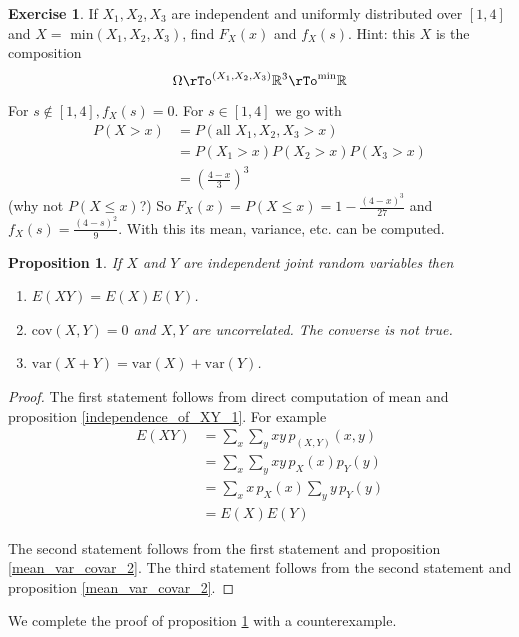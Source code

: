 \documentclass[12pt]{amsart}
\newtheorem{proposition}[theorem]{Proposition}
\theoremstyle{definition}
\newtheorem{exercise}[theorem]{Exercise}
\begin{document}
\begin{exercise} \label{minimum} If $X_1, X_2, X_3$ are independent and uniformly distributed over $[1,4]$ and $X= \text{ min}(X_1, X_2, X_3)$, find $F_X(x)$ and $f_X(s)$. Hint: this $X$ is the composition
$$\Omega \rTo^{(X_1, X_2, X_3)} \mathbb{R}^3 \rTo^{\textnormal{min}} \mathbb{R}$$

For $s \nin [1,4], f_X(s)=0$. For $s \in [1,4]$ we go with
\begin{align*}
P(X > x) & = P(\text{all } X_1, X_2, X_3 > x) \\
 & = P(X_1 > x)P(X_2 > x)P(X_3 > x) \\
 & = \left( \frac{4 - x}{3} \right)^{3}
\end{align*}
(why not $P(X \leq x)$?) So $F_X(x) = P(X \leq x) =1- \frac{(4 - x)^{3}}{27}$ and $f_X(s) = \frac{(4 - s)^2}{9}$. With this its mean, variance, etc. can be computed.
\end{exercise}

\begin{proposition} \label{mean_var_covar_3} If $X$ and $Y$ are independent joint random variables then
\begin{enumerate}[1.]
\item  $E(XY) = E(X)E(Y)$.
\item $\text{cov}(X, Y) = 0$ and $X, Y$ are uncorrelated. The converse is not true.
\item $\text{var}(X + Y) = \text{var}(X) + \text{var}(Y)$.
\end{enumerate}
\end{proposition}
\begin{proof} The first statement follows from direct computation of mean and proposition \ref{independence_of_XY_1}. For example
\begin{align*}
E(XY) & = \sum\limits_x \sum\limits_y xy \, p_{(X, Y)}(x, y) \\
 & = \sum\limits_x \sum\limits_y xy \, p_X(x)p_Y(y) \\
 & = \sum\limits_x x \,p_X(x) \sum\limits_y y \, p_Y(y) \\
 & = E(X)E(Y)
\end{align*}

The second statement follows from the first statement and proposition \ref{mean_var_covar_2}. The third statement follows from the second statement and proposition \ref{mean_var_covar_2}.
\end{proof}

We complete the proof of proposition \ref{mean_var_covar_3} with a counterexample.
\end{document}
